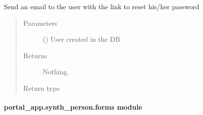\documentclass[letterpaper,10pt,english]{sphinxmanual}
\begin{document}
\begin{fulllineitems}
\label{\detokenize{CE_app.synth_person:CE_app.synth_person.email.send_person_file_downloaded}}
\sphinxAtStartPar
Send an email to the user with the link to reset his/her password
\begin{quote}\begin{description}
\item[{Parameters}] \leavevmode
\sphinxAtStartPar
{} ({\hyperref[\detokenize{CE_app:CE_app.models.User}]{}}) \textendash{} User created in the DB

\item[{Returns}] \leavevmode
\sphinxAtStartPar
Nothing.

\item[{Return type}] \leavevmode
\sphinxAtStartPar


\end{description}\end{quote}

\end{fulllineitems}



\paragraph{portal\_app.synth\_person.forms module}
\label{\detokenize{CE_app.synth_person:module-CE_app.synth_person.forms}}\label{\detokenize{CE_app.synth_person:portal-app-synth-person-forms-module}}
\end{document}
